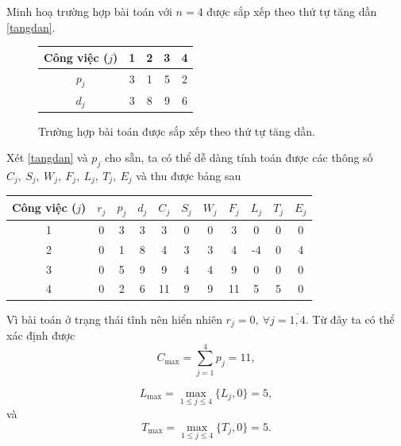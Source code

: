 \begin{vd}
	Minh hoạ trường hợp bài toán với $n=4$ được sắp xếp theo thứ tự tăng dần \eqref{tangdan}.
	\begin{figure}[h!]
	\centering
	\begin{tabular}{|c | c c c c |} 
		\hline
		Công việc ($j$) & 1 & 2 & 3 & 4 \\
		\hline\hline
		$p_j$ & 3 & 1 & 5 & 2 \\
		$d_j$ & 3 & 8 & 9 & 6 \\
		\hline
	\end{tabular}
	\caption{\label{tangdan} Trường hợp bài toán được sắp xếp theo thứ tự tăng dần.}
	\end{figure}

	Xét \eqref{tangdan} và $p_j$ cho sẵn, ta có thể dễ dàng tính toán được các thông số $C_j, \: S_j, \: W_j, \: F_j, \: L_j, \: T_j, \: E_j$ và thu được bảng sau
\begin{table}[h!]
		\centering
		 \begin{tabular}{|c || c c c c c c c c c c|}
		 \hline
		 Công việc ($j$) & $r_j$ & $p_j$ & $d_j$ & $C_j$ & $S_j$ & $W_j$ & $F_j$ & $L_j$ & $T_j$ & $E_j$ \\
		 \hline
		 1 & 0 & 3 & 3 & 3 & 0 & 0 & 3 & 0 & 0 & 0 \\
		 \hline
		 2 & 0 & 1 & 8 & 4 & 3 & 3 & 4 & -4 & 0 & 4 \\
		 \hline
		 3 & 0 & 5 & 9 & 9 & 4 & 4 & 9 & 0 & 0 & 0 \\
		 \hline
		 4 & 0 & 2 & 6 & 11 & 9 & 9 & 11 & 5 & 5 & 0 \\
		 \hline
		 \end{tabular}
	\end{table}

Vì bài toán ở trạng thái tĩnh nên hiển nhiên $r_j = 0, \: \forall j=\overline{1,4}$. Từ đây ta có thể xác định được
\begin{equation*}
C_{\max} = \sum_{j=1}^4 p_j = 11,
\end{equation*}

\begin{equation*}
	L_{\max} = \max _{1 \leq j \leq 4} \{L_j, 0\} = 5,
\end{equation*}
và
\begin{equation*}
	T_{\max} = \max _{1 \leq j \leq 4} \{T_j, 0\} = 5.
\end{equation*}


\end{vd}
